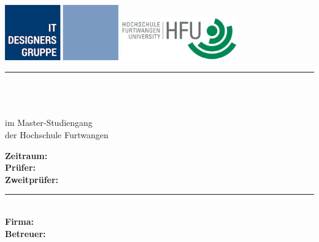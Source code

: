 
\newcommand{\HRule}[2]{\noindent\rule[#1]{\linewidth}{#2}} %
\newcommand{\vlinespace}[1]{\vspace*{#1\baselineskip}} %
\newcommand{\titleemph}[1]{\textbf{#1}} %

\begin{titlepage}
 \sffamily %
      \includegraphics[scale=0.7]{resources/img/logo_itdesigners}
      \hfill
      \includegraphics[width=5cm]{resources/img/logo_hfu}
      \HRule{13pt}{1pt}
      \centering
      \Large
      \vlinespace{1}\\
      \workTyp\\
      \vspace{1em}
      \huge
      \workTitel\\
%
      \Large
      \vlinespace{2}
          im Master-Studiengang \workStudiengang\\
          der Hochschule Furtwangen\\

      \vlinespace{2}
      \workNameStudent
%
   \vfill
   \raggedright
%
   \large
   \titleemph{Zeitraum:} \workSemester \\ %
   \titleemph{Prüfer:} \workPruefer \\
   \titleemph{Zweitprüfer:} \workBetreuer \\ %

   \vlinespace{1}
   \HRule{13pt}{1pt} \\
   \titleemph{Firma:} \workFirma \\
   \titleemph{Betreuer:} \workBetreuer
%
\end{titlepage}
